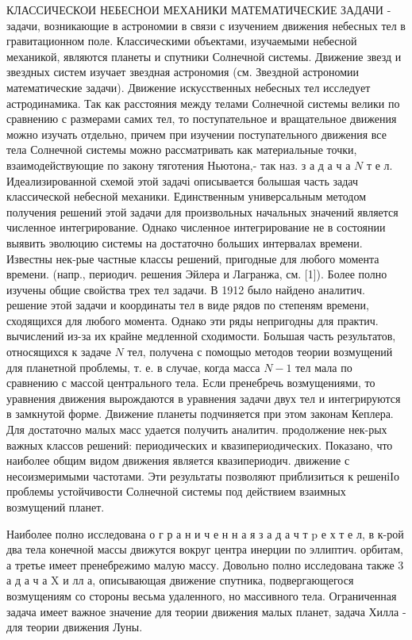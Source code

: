 \documentclass[10pt]{article}
\begin{document}
КЛАССИЧЕСКОИ НЕБЕСНОИ МЕХАНИКИ МАТЕМАТИЧЕСКИЕ ЗАДАЧИ - задачи, возникающие в астрономии в связи с изучением движения небесных тел в гравитационном поле. Классическими объектами, изучаемыми небесной механикой, являются планеты и спутники Солнечной системы. Движение звезд и звездных систем изучает звездная астрономия (см. Звездной астрономии математические задачи). Движение искусственных небесных тел исследует астродинамика. Так как расстояния между телами Солнечной системы велики по сравнению с размерами самих тел, то поступательное и вращательное движения можно изучать отдельно, причем при изучении поступательного движения все тела Солнечной системы можно рассматривать как материальные точки, взаимодействующие по закону тяготения Ньютона,- так наз. з а д а ч а $N$ т е л. Идеализированной схемой этой задачі описывается болышая часть задач классической небесной механики. Единственным универсальным методом получения решений этой задачи для произвольных начальных значений является численное интегрирование. Однако численное интегрирование не в состоянии выявить эволюцию системы на достаточно больших интервалах времени. Известны нек-рые частные классы решений, пригодные для любого момента времени. (напр., периодич. решения Эйлера и Лагранжа, см. [1]). Более полно изучены общие свойства трех тел задачи. В 1912 было найдено аналитич. решение этой задачи и координаты тел в виде рядов по степеням времени, сходящихся для любого момента. Однако эти ряды непригодны для практич. вычислений из-за их крайне медленной сходимости. Большая часть результатов, относящихся к задаче $N$ тел, получена с помощыо методов теории возмущений для планетной проблемы, т. е. в случае, когда масса $N-1$ тел мала по сравнению с массой центрального тела. Если пренебречь возмущениями, то уравнения движения вырождаются в уравнения задачи двух тел и интегрируются в замкнутой форме. Движение планеты подчиняется при этом законам Кеплера. Для достаточно малых масс удается получить аналитич. продолжение нек-рых важных классов решений: периодических и квазипериодических. Показано, что наиболее общим видом движения является квазипериодич. движение с несоизмеримыми частотами. Эти результаты позволяют приблизиться к решеніІо проблемы устойчивости Солнечной системы под действием взаимных возмущений планет.



Наиболее полно исследована о г р а н и ч е н н а я з а д а ч т p е х т е л, в к-рой два тела конечной массы движутся вокруг центра инерции по эллиптич. орбитам, а третье имеет пренебрежимо малую массу. Довольно полно исследована также 3 а д а ч а X и лл а, описывающая движение спутника, подвергающегося возмущениям со стороны весьма удаленного, но массивного тела. Ограниченная задача имеет важное значение для теории движения малых планет, задача Хилла - для теории движения Луны.
\end{document}
